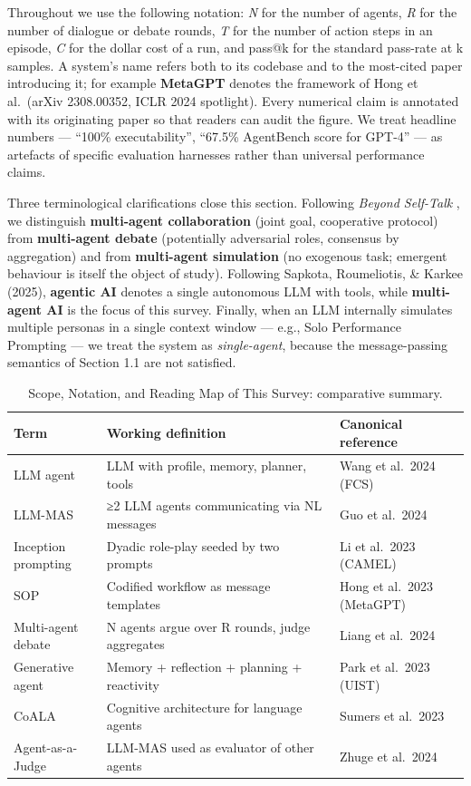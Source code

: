 \documentclass{article}
\begin{document}
Throughout we use the following notation: \emph{N} for the number of agents, \emph{R} for the number of dialogue or debate rounds, \emph{T} for the number of action steps in an episode, \emph{C} for the dollar cost of a run, and pass@k for the standard pass-rate at k samples. A system's name refers both to its codebase and to the most-cited paper introducing it; for example \textbf{MetaGPT} denotes the framework of Hong et al.~(arXiv 2308.00352, ICLR 2024 spotlight). Every numerical claim is annotated with its originating paper so that readers can audit the figure. We treat headline numbers --- ``100\% executability'', ``67.5\% AgentBench score for GPT-4'' --- as artefacts of specific evaluation harnesses rather than universal performance claims.

Three terminological clarifications close this section. Following \emph{Beyond Self-Talk} \citep{yan20252025}, we distinguish \textbf{multi-agent collaboration} (joint goal, cooperative protocol) from \textbf{multi-agent debate} (potentially adversarial roles, consensus by aggregation) and from \textbf{multi-agent simulation} (no exogenous task; emergent behaviour is itself the object of study). Following Sapkota, Roumeliotis, \& Karkee (2025), \textbf{agentic AI} denotes a single autonomous LLM with tools, while \textbf{multi-agent AI} is the focus of this survey. Finally, when an LLM internally simulates multiple personas in a single context window --- e.g., Solo Performance Prompting --- we treat the system as \emph{single-agent}, because the message-passing semantics of Section 1.1 are not satisfied.

\begin{table}[t]
\centering
\caption{Scope, Notation, and Reading Map of This Survey: comparative summary.}
\label{tab:scope-notation-and-reading-map-of-this-survey}
\begin{tabular}{>{\raggedright\arraybackslash}p{0.2088\linewidth}
  >{\raggedright\arraybackslash}p{0.5055\linewidth}
  >{\raggedright\arraybackslash}p{0.2857\linewidth}}
\toprule
Term & Working definition & Canonical reference \\
\midrule
LLM agent & LLM with profile, memory, planner, tools & Wang et al.~2024 (FCS) \\
LLM-MAS & ≥2 LLM agents communicating via NL messages & Guo et al.~2024 \\
Inception prompting & Dyadic role-play seeded by two prompts & Li et al.~2023 (CAMEL) \\
SOP & Codified workflow as message templates & Hong et al.~2023 (MetaGPT) \\
Multi-agent debate & N agents argue over R rounds, judge aggregates & Liang et al.~2024 \\
Generative agent & Memory + reflection + planning + reactivity & Park et al.~2023 (UIST) \\
CoALA & Cognitive architecture for language agents & Sumers et al.~2023 \\
Agent-as-a-Judge & LLM-MAS used as evaluator of other agents & Zhuge et al.~2024 \\
\end{tabular}
\end{table}
\end{document}
